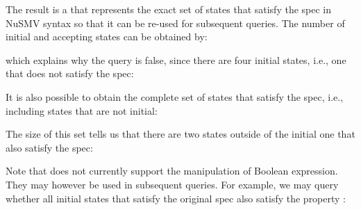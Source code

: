 \documentclass[letterpaper,10pt,english]{sphinxmanual}
\begin{document}
The result is a  that represents the exact set of states that satisfy the spec in NuSMV syntax so that it can be re-used for subsequent queries.
The number of initial and accepting states can be obtained by:

\begin{sphinxVerbatim}[commandchars=\\\{\}]
\PYG{p}{[}\PYG{p}{]}
\end{sphinxVerbatim}

which explains why the query is false, since there are four initial states, i.e., one that does not satisfy the spec:

\begin{sphinxVerbatim}[commandchars=\\\{\}]
\PYG{p}{[}\PYG{p}{]}
\end{sphinxVerbatim}

It is also possible to obtain the complete set of states that satisfy the spec, i.e., including states that are not initial:

\begin{sphinxVerbatim}[commandchars=\\\{\}]
\PYG{p}{[}\PYG{p}{]}
\end{sphinxVerbatim}

The size of this set tells us that there are two states outside of the initial one that also satisfy the spec:

\begin{sphinxVerbatim}[commandchars=\\\{\}]
\PYG{p}{[}\PYG{p}{]}
\end{sphinxVerbatim}

Note that  does not currently support the manipulation of Boolean expression. They may however be used in subsequent queries.
For example, we may query whether all initial states that satisfy the original spec also satisfy the property :
\end{document}
